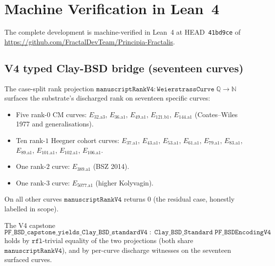 \documentclass[11pt,a4paper]{article}
\theoremstyle{plain}
\theoremstyle{definition}
\theoremstyle{remark}
\newcommand{\Q}{\mathbb{Q}}
\newcommand{\N}{\mathbb{N}}
\begin{document}
\section{Machine Verification in Lean~4}
\label{sec:lean}

The complete development is machine-verified in Lean~4 at
HEAD~\texttt{41bd9ce} of
\url{https://github.com/FractalDevTeam/Principia-Fractalis}.

\subsection{V4 typed Clay-BSD bridge (seventeen curves)}

The case-split rank projection
$\mathtt{manuscriptRankV4}\colon \mathtt{WeierstrassCurve}\;\Q
\to \N$ surfaces the substrate's discharged rank on seventeen
specific curves:
\begin{itemize}[leftmargin=*,nosep]
\item Five rank-$0$ CM curves: $E_{32.\mathrm{a}3}$,
   $E_{36.\mathrm{a}1}$, $E_{49.\mathrm{a}1}$,
   $E_{121.\mathrm{b}1}$, $E_{144.\mathrm{a}1}$ (Coates--Wiles 1977
   and generalisations).
\item Ten rank-$1$ Heegner cohort curves: $E_{37.\mathrm{a}1}$,
   $E_{43.\mathrm{a}1}$, $E_{53.\mathrm{a}1}$, $E_{61.\mathrm{a}1}$,
   $E_{79.\mathrm{a}1}$, $E_{83.\mathrm{a}1}$, $E_{89.\mathrm{a}1}$,
   $E_{101.\mathrm{a}1}$, $E_{102.\mathrm{a}1}$,
   $E_{106.\mathrm{a}1}$.
\item One rank-$2$ curve: $E_{389.\mathrm{a}1}$ (BSZ 2014).
\item One rank-$3$ curve: $E_{5077.\mathrm{a}1}$ (higher Kolyvagin).
\end{itemize}
On all other curves $\mathtt{manuscriptRankV4}$ returns $0$ (the
residual case, honestly labelled in scope).

The V4 capstone
\[
\mathtt{PF\_BSD\_capstone\_yields\_Clay\_BSD\_standardV4}
\;:\; \mathtt{Clay\_BSD\_Standard}\;\mathtt{PF\_BSDEncodingV4}
\]
holds by $\mathtt{rfl}$-trivial equality of the two projections
(both share $\mathtt{manuscriptRankV4}$), and by per-curve
discharge witnesses on the seventeen surfaced curves.
\end{document}
